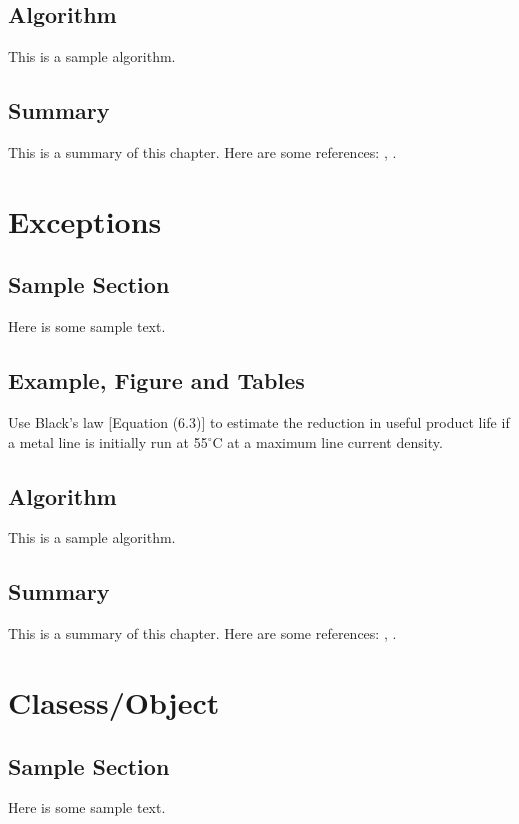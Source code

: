\documentclass{wileySix}
\begin{document}
\section{Algorithm}
This is a sample algorithm.

\section{Summary}
This is a summary of this chapter.
Here are some references: \cite{xkilby}, \cite{xberen}.

\chapter{Exceptions}

\section{Sample Section}
Here is some sample text.

\section{Example, Figure and Tables}
\vskip6pt
\begin{example}
	Use Black's law [Equation (6.3)] to estimate the reduction in useful product
	life if a metal line is initially run at 55$^\circ$C at a maximum line
	current density.
\end{example}

\section{Algorithm}
This is a sample algorithm.

\section{Summary}
This is a summary of this chapter.
Here are some references: \cite{xkilby}, \cite{xberen}.

\chapter{Clasess/Object}

\section{Sample Section}
Here is some sample text.
\end{document}
